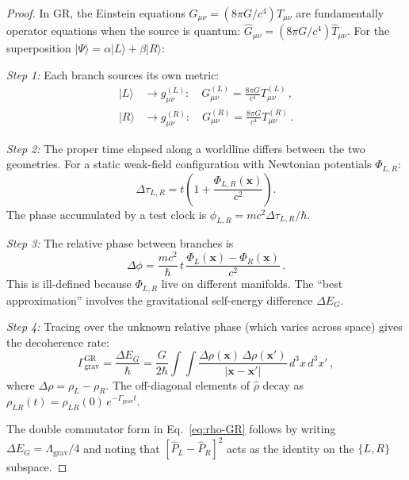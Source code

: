 \documentclass[aps,prl,twocolumn,superscriptaddress,nofootinbib,longbibliography]{revtex4-2}
\begin{document}
\begin{proof}
In GR, the Einstein equations $G_{\mu\nu} = (8\pi G/c^4)T_{\mu\nu}$ are
fundamentally operator equations when the source is quantum:
$\hat{G}_{\mu\nu} = (8\pi G/c^4)\hat{T}_{\mu\nu}$. For the
superposition $|\Psi\rangle = \alpha|L\rangle + \beta|R\rangle$:

\emph{Step 1:} Each branch sources its own metric:
\begin{align}
|L\rangle &\to g_{\mu\nu}^{(L)}: \quad G_{\mu\nu}^{(L)}
= \frac{8\pi G}{c^4} T_{\mu\nu}^{(L)}\,, \\
|R\rangle &\to g_{\mu\nu}^{(R)}: \quad G_{\mu\nu}^{(R)}
= \frac{8\pi G}{c^4} T_{\mu\nu}^{(R)}\,.
\end{align}

\emph{Step 2:} The proper time elapsed along a worldline differs between
the two geometries. For a static weak-field configuration with
Newtonian potentials $\Phi_{L,R}$:
\begin{equation}
\Delta\tau_{L,R} = t\left(1 + \frac{\Phi_{L,R}(\mathbf{x})}{c^2}\right).
\end{equation}
The phase accumulated by a test clock is
$\phi_{L,R} = mc^2\Delta\tau_{L,R}/\hbar$.

\emph{Step 3:} The relative phase between branches is
\begin{equation}
\Delta\phi = \frac{mc^2}{\hbar}\,t\,
\frac{\Phi_L(\mathbf{x}) - \Phi_R(\mathbf{x})}{c^2}\,.
\end{equation}
This is ill-defined because $\Phi_{L,R}$ live on different manifolds.
The ``best approximation'' involves the gravitational self-energy
difference $\Delta E_G$.

\emph{Step 4:} Tracing over the unknown relative phase (which varies
across space) gives the decoherence rate:
\begin{equation}
\Gamma_{\text{grav}}^{\text{GR}} = \frac{\Delta E_G}{\hbar}
= \frac{G}{2\hbar}\int\!\!\int
\frac{\Delta\rho(\mathbf{x})\,\Delta\rho(\mathbf{x}')}
{|\mathbf{x} - \mathbf{x}'|}\,d^3x\,d^3x'\,,
\end{equation}
where $\Delta\rho = \rho_L - \rho_R$. The off-diagonal elements of
$\hat{\rho}$ decay as $\rho_{LR}(t) = \rho_{LR}(0)\,
e^{-\Gamma_{\text{grav}}t}$.

The double commutator form in Eq.~\eqref{eq:rho-GR} follows by
writing $\Delta E_G = \Lambda_{\text{grav}}/4$ and noting that
$[\hat{P}_L - \hat{P}_R]^2$ acts as the identity on the $\{L, R\}$
subspace.
\end{proof}
\end{document}
